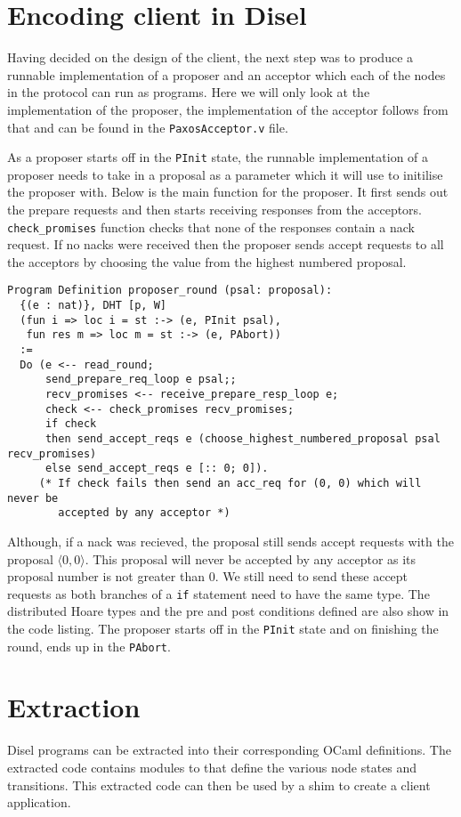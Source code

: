 \section{Encoding client in Disel}
Having decided on the design of the client, the next step was to produce a
runnable implementation of a
proposer and an acceptor which each of the nodes in the protocol can run as programs. Here we
will only look at the implementation of the proposer, the implementation of
the acceptor follows from that and can be found in the \texttt{PaxosAcceptor.v} file.

As a proposer starts off in the \texttt{PInit} state, the runnable implementation
of a proposer needs to take in a proposal as a parameter which it will use to
initilise the proposer with. Below is the main function for the proposer.
It first sends out the prepare requests and then starts receiving responses
from the acceptors. \texttt{check\_promises} function checks that none of the
responses contain a nack request. If no nacks were received then the proposer
sends accept requests to all the acceptors by choosing the value from the
highest numbered proposal.

\begin{lstlisting}
Program Definition proposer_round (psal: proposal):
  {(e : nat)}, DHT [p, W]
  (fun i => loc i = st :-> (e, PInit psal),
   fun res m => loc m = st :-> (e, PAbort))
  :=
  Do (e <-- read_round;
      send_prepare_req_loop e psal;;
      recv_promises <-- receive_prepare_resp_loop e;
      check <-- check_promises recv_promises;
      if check
      then send_accept_reqs e (choose_highest_numbered_proposal psal recv_promises)
      else send_accept_reqs e [:: 0; 0]).
     (* If check fails then send an acc_req for (0, 0) which will never be
        accepted by any acceptor *)
\end{lstlisting}

Although, if a nack was recieved, the proposal still sends
accept requests with the proposal $\langle 0, 0 \rangle$. This proposal will
never be accepted by any acceptor as its proposal number is not greater than 0.
We still need to send these accept requests as both branches of a \texttt{if}
statement need to have the same type. The distributed Hoare types and the pre and post conditions
defined are also show in the code listing. The proposer starts off in the \texttt{PInit}
state and on finishing the round, ends up in the \texttt{PAbort}.


\section{Extraction}
Disel programs can be extracted into their corresponding OCaml definitions.
The extracted code contains modules to that define the various node states
and transitions. This extracted code can then be used by a shim to create a
client application.

